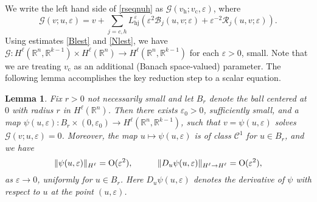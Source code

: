 \documentclass[10pt]{article}
\newtheorem{Lemma}{Lemma}[section]
\newcommand{\R}{\mathbb{R}}
\newcommand{\rmO}{\mathrm{O}}
\newcommand{\eps}{\varepsilon}
\newcommand{\B}{\mathcal{B}}
\newcommand{\G}{\mathcal{G}}
\newcommand{\Rm}{\mathcal{R}}
\begin{document}
We write the left hand side of \eqref{rseqnuh} as $\G(v_\mathrm{h}; v_\mathrm{c},\eps)$, where
\[
\G(v;u,\eps) = v+ \sum_{j=c,h} L_\mathrm{hj}^{\eps}\left( \eps^2\B_j(u,v;\eps)+\eps^{-2}\Rm_j(u,v;\eps) \right). 
\]
Using estimates \eqref{Blest} and \eqref{Nlest}, we have $\G : H^\ell(\R^n,\R^{k-1}) \times H^\ell(\R^n) \to H^\ell(\R^n,\R^{k-1})$ for each $\eps >0$, small.
Note that we are treating $v_\mathrm{c}$ as an additional (Banach space-valued) parameter. The following lemma accomplishes the key reduction step to a scalar equation.
\begin{Lemma}\label{Lemuh} Fix $r>0$ not necessarily small and let $B_r$ denote the ball centered at $0$ with radius $r$ in $H^\ell(\R^n)$. Then  there exists $\eps_0>0$, sufficiently small, and a map $\psi(u,\eps): B_r \times (0,\eps_0) \to H^\ell(\R^n,\R^{k-1})$, such that $v = \psi(u, \eps)$ solves $\G(v;u,\eps) = 0$. Moreover, the map $u \mapsto \psi(u,\eps)$ is of class $\mathscr{C}^1$ for $u\in B_r$, and we have 
\[
\|\psi(u,\eps)\|_{H^\ell} = \rmO(\eps^2), \hspace{0.4in}\|D_u\psi(u,\eps)\|_{H^\ell \to H^\ell} = \rmO(\eps^2),
\] as 
$\eps \to 0$, uniformly for $u\in B_r$. Here $D_u\psi(u,\eps)$ denotes the  derivative of $\psi$ with respect to $u$ at the point $(u,\eps)$.  \end{Lemma}
\end{document}
